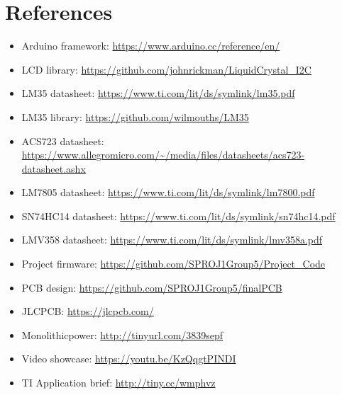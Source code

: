\clearpage
\section{References}
\label{sec:references}

\begin{itemize}
    \item Arduino framework: \url{https://www.arduino.cc/reference/en/}
    \item LCD library: \url{https://github.com/johnrickman/LiquidCrystal_I2C}
    \item LM35 datasheet: \url{https://www.ti.com/lit/ds/symlink/lm35.pdf}
    \item LM35 library: \url{https://github.com/wilmouths/LM35}
    \item ACS723 datasheet: \url{https://www.allegromicro.com/~/media/files/datasheets/acs723-datasheet.ashx}
    \item LM7805 datasheet: \url{https://www.ti.com/lit/ds/symlink/lm7800.pdf}
    \item SN74HC14 datasheet: \url{https://www.ti.com/lit/ds/symlink/sn74hc14.pdf}
    \item LMV358 datasheet: \url{https://www.ti.com/lit/ds/symlink/lmv358a.pdf}
    \item Project firmware: \url{https://github.com/SPROJ1Group5/Project_Code}
    \item PCB design: \url{https://github.com/SPROJ1Group5/finalPCB}
    \item JLCPCB: \url{https://jlcpcb.com/}
    \item Monolithicpower: \url{http://tinyurl.com/3839sepf}
    \item Video showcase: \url{https://youtu.be/KzQqgtPINDI}
    \item TI Application brief: \url{http://tiny.cc/wmphvz}
\end{itemize}
